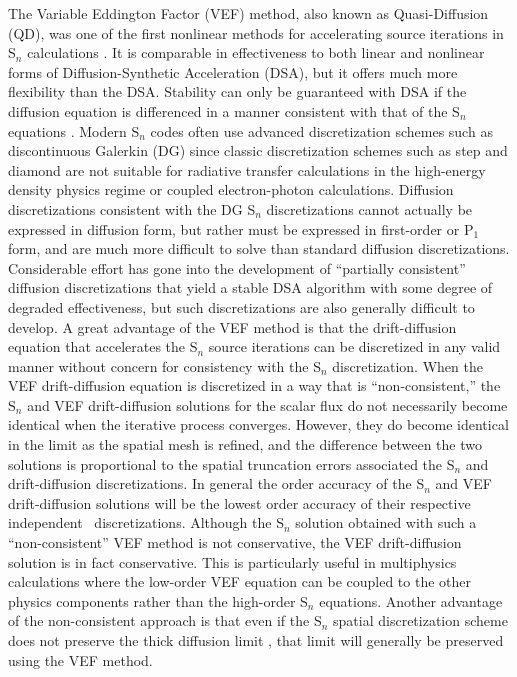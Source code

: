 The Variable Eddington Factor (VEF) method, also known as Quasi-Diffusion (QD), was one of the first nonlinear methods 
for accelerating source iterations in S$_n$ calculations \cite{*}.  It is comparable in effectiveness to both linear 
and nonlinear forms of Diffusion-Synthetic Acceleration (DSA), but it offers much more flexibility than the DSA.   
Stability can only be guaranteed with DSA if the diffusion equation is differenced in a manner consistent with that 
of the S$_n$ equations \cite{*}. Modern S$_n$ codes often use advanced discretization schemes such as discontinuous 
Galerkin (DG) since classic discretization schemes such as step and diamond are not suitable for radiative transfer 
calculations in the high-energy density physics regime or coupled electron-photon calculations.  Diffusion discretizations consistent 
with the DG S$_n$ discretizations cannot actually be expressed in diffusion form, but rather must be expressed in 
first-order or P$_1$ form, and are much more difficult to solve than standard diffusion discretizations.   Considerable 
effort has gone into the development of ``partially consistent'' diffusion discretizations that yield a stable DSA 
algorithm with some degree of degraded effectiveness, but such discretizations are also generally difficult to develop. A 
great advantage of the VEF method is that the drift-diffusion equation that accelerates the S$_n$ source iterations can be 
discretized in any valid manner without concern for consistency with the S$_n$ discretization.  When the VEF 
drift-diffusion equation is discretized in a way that is ``non-consistent,'' the S$_n$ and VEF drift-diffusion solutions 
for the scalar flux do not necessarily become identical when the iterative process converges.  However, they do become 
identical in the limit as the spatial mesh is refined, and the difference between the two solutions is proportional to 
the spatial truncation errors associated the S$_n$ and drift-diffusion discretizations.  In general the order accuracy 
of the S$_n$ and VEF drift-diffusion solutions will be the lowest order accuracy of their respective independent \
discretizations.  Although the S$_n$ solution obtained with such a ``non-consistent'' VEF method is not conservative, 
the VEF drift-diffusion solution is in fact conservative.  This is particularly useful in multiphysics calculations 
where the low-order VEF equation can be coupled to the other physics components rather than the high-order S$_n$ 
equations.  Another advantage of the non-consistent approach is that even if the S$_n$ spatial discretization 
scheme does not preserve the thick diffusion limit \cite{*}, that limit will generally be preserved using the VEF method. 
 
